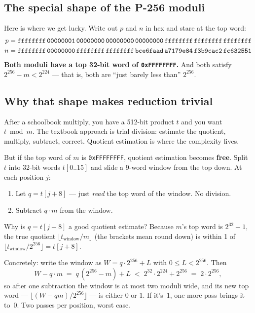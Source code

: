 \documentclass[11pt,a4paper]{article}
\begin{document}
\subsection{The special shape of the P-256 moduli}

Here is where we get lucky. Write out $p$ and $n$ in hex and stare at
the top word:
\begin{align*}
p &= \texttt{ffffffff\,00000001\,00000000\,00000000\,00000000\,ffffffff\,ffffffff\,ffffffff} \\
n &= \texttt{ffffffff\,00000000\,ffffffff\,ffffffff\,bce6faad\,a7179e84\,f3b9cac2\,fc632551}
\end{align*}
\textbf{Both moduli have a top 32-bit word of \texttt{0xFFFFFFFF}.}
And both satisfy $2^{256} - m < 2^{224}$ --- that is, both are ``just
barely less than'' $2^{256}$.

\subsection{Why that shape makes reduction trivial}

After a schoolbook multiply, you have a 512-bit product $t$ and you
want $t \bmod m$. The textbook approach is trial division: estimate
the quotient, multiply, subtract, correct. Quotient estimation is
where the complexity lives.

But if the top word of $m$ is \texttt{0xFFFFFFFF}, quotient estimation
becomes \textbf{free}. Split $t$ into 32-bit words $t[0..15]$ and
slide a 9-word window from the top down. At each position $j$:
\begin{enumerate}
\item Let $q = t[j{+}8]$ --- just \emph{read} the top word of the
  window. No division.
\item Subtract $q \cdot m$ from the window.
\end{enumerate}

Why is $q = t[j{+}8]$ a good quotient estimate? Because $m$'s top
word is $2^{32}-1$, the true quotient
$\lfloor t_{\text{window}} / m \rfloor$ (the brackets mean round down) is within 1 of
$\lfloor t_{\text{window}} / 2^{256} \rfloor = t[j{+}8]$.

Concretely: write the window as $W = q \cdot 2^{256} + L$ with
$0 \le L < 2^{256}$. Then
\[
  W - q \cdot m \;=\; q\,(2^{256} - m) + L
  \;<\; 2^{32} \cdot 2^{224} + 2^{256}
  \;=\; 2 \cdot 2^{256},
\]
so after one subtraction the window is at most two moduli wide, and
its new top word --- $\lfloor (W - qm) / 2^{256} \rfloor$ --- is
either 0 or 1. If it's~1, one more pass brings it to~0. Two passes
per position, worst case.
\end{document}
